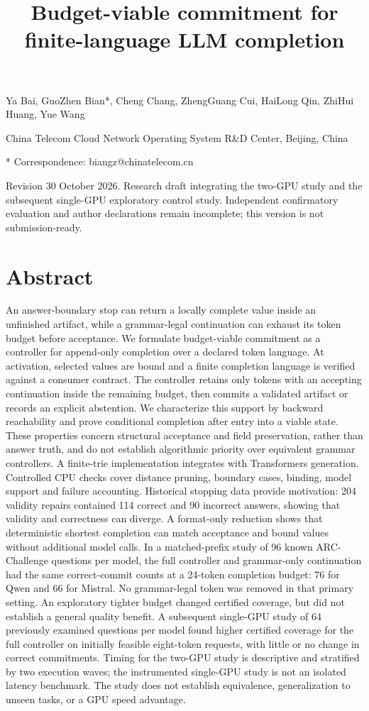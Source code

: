 \documentclass[
  12pt,
  a4paper,
]{article}
\title{Budget-viable commitment for finite-language LLM completion}
\author{}
\date{}
\begin{document}
\maketitle

Ya Bai, GuoZhen Bian*, Cheng Chang, ZhengGuang Cui, HaiLong Qin, ZhiHui
Huang, Yue Wang

China Telecom Cloud Network Operating System R\&D Center, Beijing, China

* Correspondence: biangz@chinatelecom.cn

Revision 30 October 2026. Research draft integrating the two-GPU study and the subsequent single-GPU exploratory control study. Independent confirmatory evaluation and author declarations remain incomplete; this version is not submission-ready.

\section{Abstract}\label{abstract}

An answer-boundary stop can return a locally complete value inside an unfinished artifact, while a grammar-legal continuation can exhaust its token budget before acceptance. We formulate budget-viable commitment as a controller for append-only completion over a declared token language. At activation, selected values are bound and a finite completion language is verified against a consumer contract. The controller retains only tokens with an accepting continuation inside the remaining budget, then commits a validated artifact or records an explicit abstention. We characterize this support by backward reachability and prove conditional completion after entry into a viable state. These properties concern structural acceptance and field preservation, rather than answer truth, and do not establish algorithmic priority over equivalent grammar controllers. A finite-trie implementation integrates with Transformers generation. Controlled CPU checks cover distance pruning, boundary cases, binding, model support and failure accounting. Historical stopping data provide motivation: 204 validity repairs contained 114 correct and 90 incorrect answers, showing that validity and correctness can diverge. A format-only reduction shows that deterministic shortest completion can match acceptance and bound values without additional model calls. In a matched-prefix study of 96 known ARC-Challenge questions per model, the full controller and grammar-only continuation had the same correct-commit counts at a 24-token completion budget: 76 for Qwen and 66 for Mistral. No grammar-legal token was removed in that primary setting. An exploratory tighter budget changed certified coverage, but did not establish a general quality benefit. A subsequent single-GPU study of 64 previously examined questions per model found higher certified coverage for the full controller on initially feasible eight-token requests, with little or no change in correct commitments. Timing for the two-GPU study is descriptive and stratified by two execution waves; the instrumented single-GPU study is not an isolated latency benchmark. The study does not establish equivalence, generalization to unseen tasks, or a GPU speed advantage.
\end{document}

